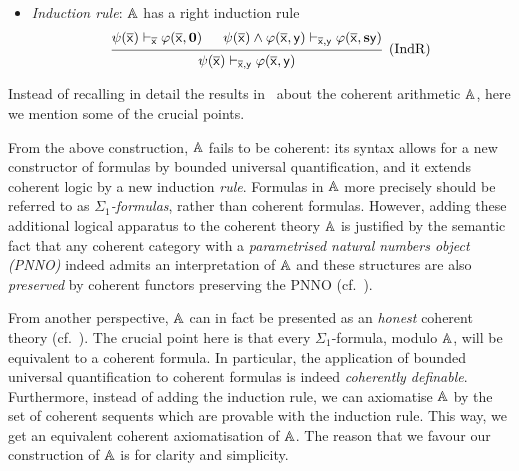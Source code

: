 \begin{definition}
\begin{itemize}
\[\begin{prooftree}
      \end{prooftree}
    \]
    Note the context specifies $z$ must not occur in $\psi$ as a free variable.
  \item \emph{Induction rule}: $\mathbb{A}$ has a right induction rule
    \[
      \begin{prooftree}
        \hypo{\psi(\ov{\ms x}) \vdash_{\ov{\ms x}} \varphi(\ov{\ms x},\mb 0)}
        \hypo{\psi(\ov{\ms x}) \wedge \varphi(\ov{\ms x},\ms y) \vdash_{\ov{\ms x},\ms y} \varphi(\ov{\ms x},\mb s\ms y)}
        \infer 2[(IndR)]{\psi(\ov{\ms x}) \vdash_{\ov{\ms x},\ms y} \varphi(\ov{\ms x},\ms y)}
      \end{prooftree}
    \]
  \end{itemize}
\end{definition}

Instead of recalling in detail the results in~\citet{ye_categorical_2026} about the coherent arithmetic $\mathbb{A}$, here we mention some of the crucial points.

\begin{remark}
  From the above construction, $\mathbb{A}$ fails to be coherent: its syntax allows for a new constructor of formulas by bounded universal quantification, and it extends coherent logic by a new induction \emph{rule}. Formulas in $\mathbb{A}$ more precisely should be referred to as \emph{$\Sigma_1$-formulas}, rather than coherent formulas. However, adding these additional logical apparatus to the coherent theory $\mathbb{A}$ is justified by the semantic fact that any coherent category with a \emph{parametrised natural numbers object (\gls{PNNO})} indeed admits an interpretation of $\mathbb{A}$ and these structures are also \emph{preserved} by coherent functors preserving the \gls{PNNO} (cf.~\citet[\S 3]{ye_categorical_2026}).
\end{remark}

\begin{remark}\label{rem:coherentT}
  From another perspective, $\mathbb{A}$ can in fact be presented as an \emph{honest} coherent theory (cf.~\citet[Prop.~3]{ye_categorical_2026}). The crucial point here is that every $\Sigma_1$-formula, modulo $\mathbb{A}$, will be equivalent to a coherent formula. In particular, the application of bounded universal quantification to coherent formulas is indeed \emph{coherently definable}. Furthermore, instead of adding the induction rule, we can axiomatise $\mathbb{A}$ by the set of coherent sequents which are provable with the induction rule. This way, we get an equivalent coherent axiomatisation of $\mathbb{A}$. The reason that we favour our construction of $\mathbb{A}$ is for clarity and simplicity. 
\end{remark}

